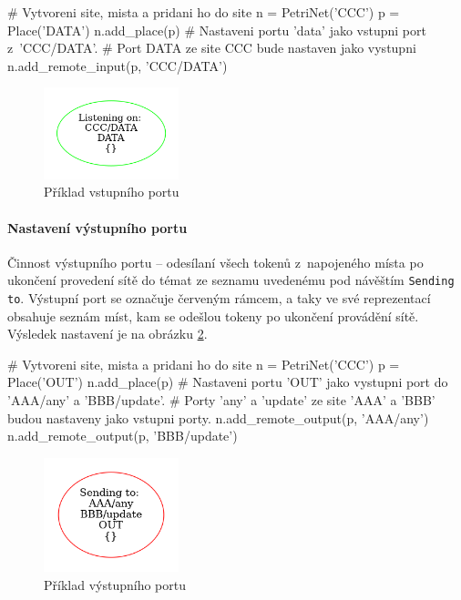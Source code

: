 \begin{python}
  # Vytvoreni site, mista a pridani ho do site
  n = PetriNet('CCC')
  p = Place('DATA')
  n.add_place(p)
  # Nastaveni portu 'data' jako vstupni port z~'CCC/DATA'.
  # Port DATA ze site CCC bude nastaven jako vystupni
  n.add_remote_input(p, 'CCC/DATA')
\end{python}


\begin{figure}[hbt]
 \centering
 \includegraphics[width=0.35\textwidth]{obrazky-figures/port-in.png}
 \caption{Příklad vstupního portu}
 \label{port-in}
\end{figure}

\paragraph{Nastavení výstupního portu}

Činnost výstupního portu -- odesílaní všech tokenů z~napojeného místa po ukončení provedení sítě do témat ze seznamu uvedenému pod návěštím \texttt{Sending to}. Výstupní port se označuje červeným rámcem, a taky ve své reprezentací obsahuje seznám míst, kam se odešlou tokeny po ukončení provádění sítě. Výsledek nastavení je na obrázku \ref{port-out}.

\begin{python}
  # Vytvoreni site, mista a pridani ho do site
  n = PetriNet('CCC')
  p = Place('OUT')
  n.add_place(p)
  # Nastaveni portu 'OUT' jako vystupni port do 'AAA/any' a 'BBB/update'.
  # Porty 'any' a 'update' ze site 'AAA' a 'BBB' budou nastaveny jako vstupni porty.
  n.add_remote_output(p, 'AAA/any')
  n.add_remote_output(p, 'BBB/update')
\end{python}


\begin{figure}[hbt]
  \centering
  \includegraphics[width=0.35\textwidth]{obrazky-figures/port-out.png}
  \caption{Příklad výstupního portu}
  \label{port-out}
\end{figure}


